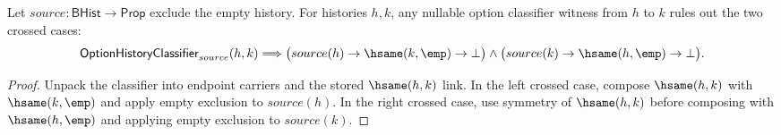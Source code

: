 \begin{theorem}
\label{thm:option-history-classifier-cross-absent-source-exclusion}
Let $source:\mathsf{BHist}\to\mathsf{Prop}$ exclude the empty history. For
histories $h,k$, any nullable option classifier witness from $h$ to $k$ rules
out the two crossed cases:
$$
\mathsf{OptionHistoryClassifier}_{source}(h,k)
\Longrightarrow
\bigl(source(h)\to\hsame(k,\emp)\to\bot\bigr)
\land
\bigl(source(k)\to\hsame(h,\emp)\to\bot\bigr).
$$
\end{theorem}
\begin{proof}
Unpack the classifier into endpoint carriers and the stored $\hsame(h,k)$
link. In the left crossed case, compose $\hsame(h,k)$ with
$\hsame(k,\emp)$ and apply empty exclusion to $source(h)$. In the right
crossed case, use symmetry of $\hsame(h,k)$ before composing with
$\hsame(h,\emp)$ and applying empty exclusion to $source(k)$.
\end{proof}

